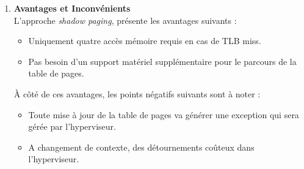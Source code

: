 \begin{enumerate}[label=\textbf{(\roman*)}]
    \item \textbf{Avantages et Inconvénients}\\
    L'approche \textit{shadow paging}, présente les avantages suivants :
    \begin{itemize}
        \item Uniquement quatre accès mémoire requis en cas de TLB miss.
        \item Pas besoin d'un support matériel supplémentaire pour le parcours de la table de pages.
    \end{itemize}
    
    À côté de ces avantages, les points négatifs suivants sont à noter :
    \begin{itemize}
        \item Toute mise à jour de la table de pages va générer une exception qui sera gérée par l'hyperviseur.
        \item A changement de contexte, des détournements coûteux dans l'hyperviseur.
    \end{itemize}
\end{enumerate}

